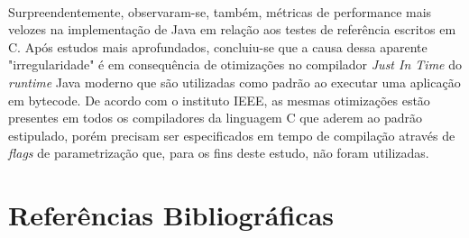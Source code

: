 \documentclass[11pt]{article}
\begin{document}
\paragraph{}
Surpreendentemente, observaram-se, também, métricas de performance mais velozes
na implementação de Java em relação aos testes de referência escritos em C. Após
estudos mais aprofundados, concluiu-se que a causa dessa aparente
"irregularidade" é em consequência de otimizações no compilador \textit{Just In
Time} do \textit{runtime} Java moderno que são utilizadas como padrão ao
executar uma aplicação em bytecode. De acordo com o instituto
IEEE\cite{machado2017comparing}, as mesmas otimizações estão presentes em todos
os compiladores da linguagem C que aderem ao padrão estipulado, porém precisam
ser especificados em tempo de compilação através de \textit{flags} de
parametrização que, para os fins deste estudo, não foram utilizadas.

\newpage
\section{Referências Bibliográficas}


\end{document}
